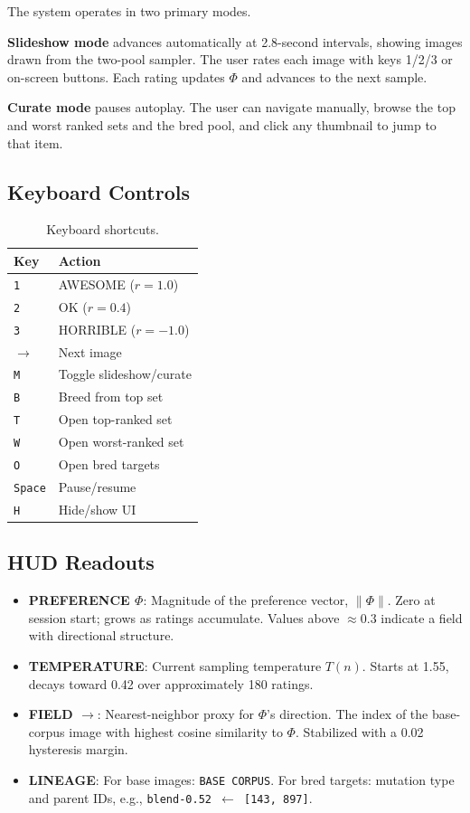 \documentclass[12pt, a4paper]{article}
\begin{document}
The system operates in two primary modes.

\textbf{Slideshow mode} advances automatically at 2.8-second intervals, showing images drawn from the two-pool sampler. The user rates each image with keys 1/2/3 or on-screen buttons. Each rating updates $\Phi$ and advances to the next sample.

\textbf{Curate mode} pauses autoplay. The user can navigate manually, browse the top and worst ranked sets and the bred pool, and click any thumbnail to jump to that item.

\subsection{Keyboard Controls}

\begin{table}[H]
\centering
\begin{tabular}{ll}
\toprule
\textbf{Key} & \textbf{Action} \\
\midrule
\texttt{1} & AWESOME ($r = 1.0$) \\
\texttt{2} & OK ($r = 0.4$) \\
\texttt{3} & HORRIBLE ($r = -1.0$) \\
\texttt{$\rightarrow$} & Next image \\
\texttt{M} & Toggle slideshow/curate \\
\texttt{B} & Breed from top set \\
\texttt{T} & Open top-ranked set \\
\texttt{W} & Open worst-ranked set \\
\texttt{O} & Open bred targets \\
\texttt{Space} & Pause/resume \\
\texttt{H} & Hide/show UI \\
\bottomrule
\end{tabular}
\caption{Keyboard shortcuts.}
\end{table}

\subsection{HUD Readouts}

\begin{itemize}[leftmargin=2em]
  \item \textbf{PREFERENCE $\Phi$}: Magnitude of the preference vector, $\|\Phi\|$. Zero at session start; grows as ratings accumulate. Values above $\approx 0.3$ indicate a field with directional structure.
  \item \textbf{TEMPERATURE}: Current sampling temperature $T(n)$. Starts at 1.55, decays toward 0.42 over approximately 180 ratings.
  \item \textbf{FIELD $\rightarrow$}: Nearest-neighbor proxy for $\Phi$'s direction. The index of the base-corpus image with highest cosine similarity to $\Phi$. Stabilized with a 0.02 hysteresis margin.
  \item \textbf{LINEAGE}: For base images: \texttt{BASE CORPUS}. For bred targets: mutation type and parent IDs, e.g., \texttt{blend-0.52 $\leftarrow$ [143, 897]}.
\end{itemize}
\end{document}

